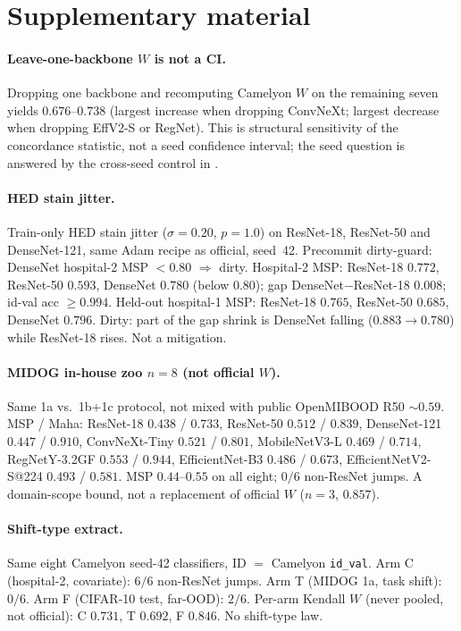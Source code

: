 \documentclass[anon]{midl}
\begin{document}
\clearpage %



\appendix
\section{Supplementary material}
\label{app:suppl}

\paragraph{Leave-one-backbone $W$ is not a CI.}
Dropping one backbone and recomputing Camelyon $W$ on the remaining seven yields $0.676$--$0.738$ (largest increase when dropping ConvNeXt; largest decrease when dropping EffV2-S or RegNet).
This is structural sensitivity of the concordance statistic, not a seed confidence interval; the seed question is answered by the cross-seed control in .

\paragraph{HED stain jitter.}
Train-only HED stain jitter ($\sigma{=}0.20$, $p{=}1.0$) on ResNet-18, ResNet-50 and DenseNet-121, same Adam recipe as official, seed~42.
Precommit dirty-guard: DenseNet hospital-2 MSP ${<}0.80$ ${\Rightarrow}$ dirty.
Hospital-2 MSP: ResNet-18 $0.772$, ResNet-50 $0.593$, DenseNet $0.780$ (below $0.80$); gap DenseNet${-}$ResNet-18 $0.008$; id-val acc ${\ge}0.994$.
Held-out hospital-1 MSP: ResNet-18 $0.765$, ResNet-50 $0.685$, DenseNet $0.796$.
Dirty: part of the gap shrink is DenseNet falling ($0.883{\to}0.780$) while ResNet-18 rises. Not a mitigation.

\paragraph{MIDOG in-house zoo $n{=}8$ (not official $W$).}
Same 1a vs.\ 1b{+}1c protocol, not mixed with public OpenMIBOOD R50 ${\sim}0.59$.
MSP / Maha: ResNet-18 $0.438$ / $0.733$, ResNet-50 $0.512$ / $0.839$, DenseNet-121 $0.447$ / $0.910$, ConvNeXt-Tiny $0.521$ / $0.801$, MobileNetV3-L $0.469$ / $0.714$, RegNetY-3.2GF $0.553$ / $0.944$, EfficientNet-B3 $0.486$ / $0.673$, EfficientNetV2-S@224 $0.493$ / $0.581$.
MSP $0.44$--$0.55$ on all eight; $0/6$ non-ResNet jumps. A domain-scope bound, not a replacement of official $W$ ($n{=}3$, $0.857$).

\paragraph{Shift-type extract.}
Same eight Camelyon seed-42 classifiers, ID ${=}$ Camelyon \texttt{id\_val}.
Arm C (hospital-2, covariate): $6/6$ non-ResNet jumps. Arm T (MIDOG 1a, task shift): $0/6$. Arm F (CIFAR-10 test, far-OOD): $2/6$.
Per-arm Kendall $W$ (never pooled, not official): C $0.731$, T $0.692$, F $0.846$. No shift-type law.
\end{document}
